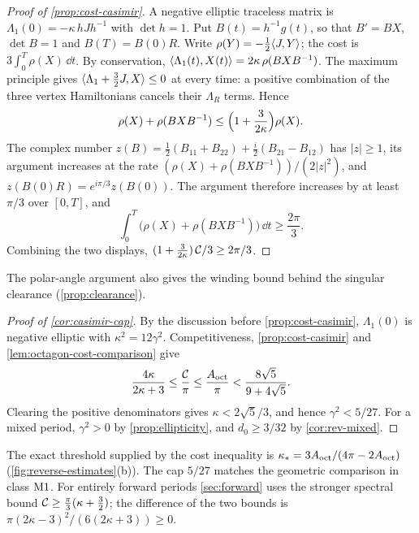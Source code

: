 \begin{proof}[Proof of \cref{prop:cost-casimir}]
A negative elliptic traceless matrix is $\Lambda_1(0)=-\kappa\,hJh^{-1}$ with $\det h=1$. Put $B(t)=h^{-1}g(t)$, so that $B'=BX$, $\det B=1$ and
$B(T)=B(0)R$. Write $\rho(Y)=-\frac12\langle J,Y\rangle$; the cost is $3\int_0^T\rho(X)\,\dd t$. By
conservation, $\langle \Lambda_1(t),X(t)\rangle=2\kappa\,\rho(BXB^{-1})$. The maximum principle gives
$\langle \Lambda_1+\frac32J,X\rangle\le0$ at every time: a positive combination of the three vertex
Hamiltonians cancels their $\Lambda_R$ terms. Hence
\[
  \rho(X)+\rho(BXB^{-1})\le\Bigl(1+\frac{3}{2\kappa}\Bigr)\rho(X).
\]
The complex number $z(B)=\frac12(B_{11}+B_{22})+\frac i2(B_{21}-B_{12})$ has $|z|\ge1$, its
argument increases at the rate $(\rho(X)+\rho(BXB^{-1}))/(2|z|^2)$, and
$z(B(0)R)=e^{i\pi/3}z(B(0))$. The argument therefore increases by at least $\pi/3$ over $[0,T]$,
and
\[
  \int_0^T\bigl(\rho(X)+\rho(BXB^{-1})\bigr)\,\dd t\ge\frac{2\pi}{3}.
\]
Combining the two displays, $(1+\frac3{2\kappa})\,\mathcal{C}/3\ge2\pi/3$.
\end{proof}

The polar-angle argument
also gives the winding bound behind the singular clearance (\cref{prop:clearance}).

\begin{proof}[Proof of \cref{cor:casimir-cap}]
By the discussion before \cref{prop:cost-casimir}, $\Lambda_1(0)$ is negative elliptic with
$\kappa^2=12\gamma^2$.
Competitiveness, \cref{prop:cost-casimir} and \cref{lem:octagon-cost-comparison} give
\[
 \frac{4\kappa}{2\kappa+3}\le\frac{\mathcal{C}}{\pi}
 \le\frac{A_{\mathrm{oct}}}{\pi}<\frac{8\sqrt5}{9+4\sqrt5}.
\]
Clearing the positive denominators gives $\kappa<2\sqrt5/3$,
and hence $\gamma^2<5/27$.
For a mixed period, $\gamma^2>0$ by \cref{prop:ellipticity}, and $d_0\ge3/32$ by
\cref{cor:rev-mixed}.
\end{proof}

The exact threshold supplied by the cost inequality is
$\kappa_*=3A_{\mathrm{oct}}/(4\pi-2A_{\mathrm{oct}})$ (\cref{fig:reverse-estimates}(b)).
The cap $5/27$ matches the geometric comparison in class $\mathrm{M1}$.
For entirely forward periods \cref{sec:forward} uses the stronger spectral bound
$\mathcal{C}\ge\frac\pi3(\kappa+\frac32)$; the difference of the
two bounds is $\pi(2\kappa-3)^2/(6(2\kappa+3))\ge0$.

